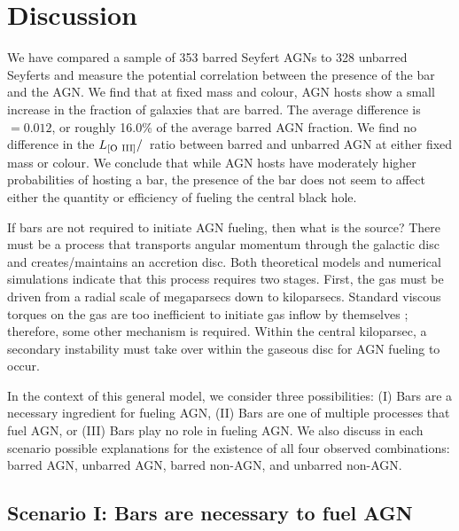 \section{Discussion}\label{sec:Discussion}


We have compared a sample of 353 barred Seyfert AGNs to 328 unbarred Seyferts and measure the potential correlation between the presence of the bar and the AGN. We find that at fixed mass and colour, AGN hosts show a small increase in the fraction of galaxies that are barred. The average difference is \db~$=0.012$, or roughly 16.0\% of the average barred AGN fraction. We find no difference in the $L_{\rm{[O~III]}}/$\mbh~ratio between barred and unbarred AGN at either fixed mass or colour. We conclude that while AGN hosts have moderately higher probabilities of hosting a bar, the presence of the bar does not seem to affect either the quantity or efficiency of fueling the central black hole.  

If bars are not required to initiate AGN fueling, then what is the source? There must be a process that transports angular momentum through the galactic disc and creates/maintains an accretion disc. Both theoretical models \citep{Shlosman1989,Shlosman1990} and numerical simulations \citep{Hopkins2010} indicate that this process requires two stages. First, the gas must be driven from a radial scale of megaparsecs down to kiloparsecs. Standard viscous torques on the gas are too inefficient to initiate gas inflow by themselves \citet{Shlosman1989,Bournaud2005}; therefore, some other mechanism is required. Within the central kiloparsec, a secondary instability must take over within the gaseous disc for AGN fueling to occur.
 
In the context of this general model, we consider three possibilities: (I) Bars are a necessary ingredient for fueling AGN, (II) Bars are one of multiple processes that fuel AGN, or (III) Bars play no role in fueling AGN. We also discuss in each scenario possible explanations for the existence of all four observed combinations: barred AGN, unbarred AGN, barred non-AGN, and unbarred non-AGN. 

\subsection{Scenario I: Bars are necessary to fuel AGN}\label{ssec:scenario1}

